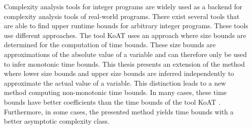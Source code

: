 Complexity analysis tools for integer programs are widely used as a backend for complexity analysis tools of real-world programs.
There exist several tools that are able to find upper runtime bounds for arbitrary integer programs.
These tools use different approaches.
The tool KoAT \cite{koat} uses an approach where size bounds are determined for the computation of time bounds.
These size bounds are approximations of the absolute value of a variable and can therefore only be used to infer monotonic time bounds.
This thesis presents an extension of the method where lower size bounds and upper size bounds are inferred independently to approximate the actual value of a variable.
This distinction leads to a new method computing non-monotonic time bounds.
In many cases, these time bounds have better coefficients than the time bounds of the tool KoAT \cite{koat}.
Furthermore, in some cases, the presented method yields time bounds with a better asymptotic complexity class. 

